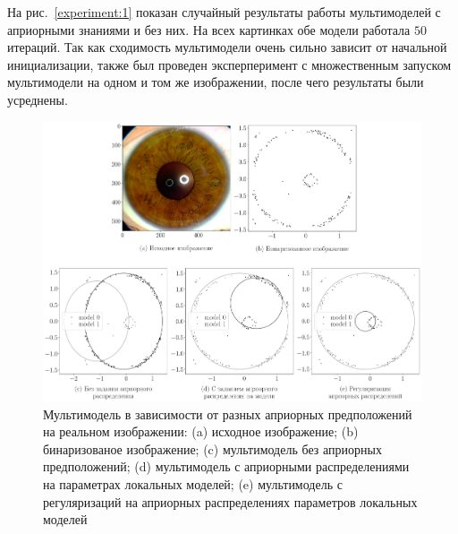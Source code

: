 \documentclass[12pt, twoside]{article}
\numberwithin{equation}{section}
\begin{document}

На рис.~\ref{experiment:1} показан случайный результаты работы мультимоделей с априорными знаниями и без них. На всех картинках обе модели работала $50$ итераций. Так как сходимость мультимодели очень сильно зависит от начальной инициализации, также был проведен эксперперимент с множественным запуском мультимодели на одном и том же изображении, после чего результаты были усреднены. 


\begin{figure}[h!t]\center
\includegraphics[width=1\textwidth]{result/experiment_real_compare}
\caption{Мультимодель в зависимости от разных априорных предположений на реальном изображении: (a) исходное изображение; (b) бинаризованое изображение; (c) мультимодель без априорных предположений; (d) мультимодель с априорными распределениями на параметрах локальных моделей; (e) мультимодель с регуляризаций на априорных распределениях параметров локальных моделей}
\label{experiment:2}
\end{figure}
\end{document}
